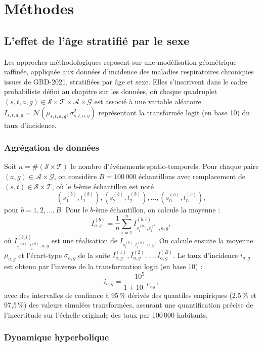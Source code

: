 \chapter{Méthodes}
\label{chap:methods}

\section{L'effet de l'âge stratifié par le sexe}

Les approches méthodologiques reposent sur une modélisation géométrique raffinée, appliquée aux données d'incidence des maladies respiratoires chroniques issues de GBD-2021, stratifiées par âge et sexe. Elles s'inscrivent dans le cadre probabiliste défini au chapitre sur les données, où chaque quadruplet $(s,t,a,g) \in \mathcal{S} \times \mathcal{T} \times \mathcal{A} \times \mathcal{G}$ est associé à une variable aléatoire $I_{s,t,a,g} \sim \mathcal{N}(\mu_{s,t,a,g}, \sigma_{s,t,a,g}^2)$ représentant la transformée logit (en base 10) du taux d'incidence.

\subsection{Agrégation de données}

Soit $n = \# (\mathcal{S} \times \mathcal{T})$ le nombre d'événements spatio-temporels. Pour chaque paire $(a,g) \in \mathcal{A} \times \mathcal{G}$, on considère $B = 100\,000$ échantillons avec remplacement de $(s,t) \in \mathcal{S} \times \mathcal{T}$, où le $b$-ème échantillon est noté
\[
(s_1^{(b)}, t_1^{(b)}), (s_2^{(b)}, t_2^{(b)}), \dots, (s_n^{(b)}, t_n^{(b)}),
\]
pour $b = 1, 2, \dots, B$. Pour le $b$-ème échantillon, on calcule la moyenne :
\[
I_{a,g}^{(b)} = \frac{1}{n} \sum_{i=1}^n I_{s_i^{(b)}, t_i^{(b)}, a, g}^{(b,i)},
\]
où $I_{s_i^{(b)}, t_i^{(b)}, a, g}^{(b,i)}$ est une réalisation de $I_{s_i^{(b)}, t_i^{(b)}, a, g}$. On calcule ensuite la moyenne $\mu_{a,g}$ et l'écart-type $\sigma_{a,g}$ de la suite $I_{a,g}^{(1)}, I_{a,g}^{(2)}, \dots, I_{a,g}^{(B)}$. Le taux d'incidence $i_{a,g}$ est obtenu par l'inverse de la transformation logit (en base 10) :
\[
i_{a,g} = \frac{10^5}{1 + 10^{-\mu_{a,g}}},
\]
avec des intervalles de confiance à 95\,\% dérivés des quantiles empiriques (2,5\,\% et 97,5\,\%) des valeurs simulées transformées, assurant une quantification précise de l'incertitude sur l'échelle originale des taux par 100\,000 habitants.

\subsection{Dynamique hyperbolique}

